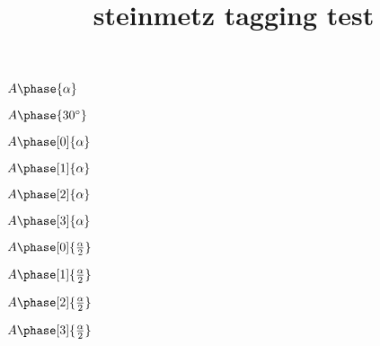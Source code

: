 \documentclass{article}
\title{steinmetz tagging test}
\begin{document}
$A\phase{\alpha}$

$A\phase{30^{\circ}}$

$A\phase[0]{\alpha}$

$A\phase[1]{\alpha}$

$A\phase[2]{\alpha}$

$A\phase[3]{\alpha}$

$A\phase[0]{\frac{\alpha}{2}}$

$A\phase[1]{\frac{\alpha}{2}}$

$A\phase[2]{\frac{\alpha}{2}}$

$A\phase[3]{\frac{\alpha}{2}}$
\end{document}
